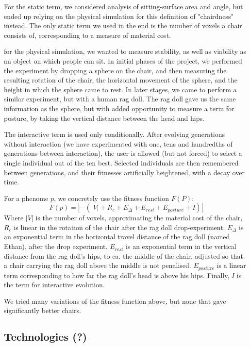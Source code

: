 For the static term, we considered analysis of sitting-surface area and angle,
but ended up relying on the physical simulation for this definition of
"chairdness" instead. The only static term we used in the end is the number of
voxels a chair consists of, corresponding to a measure of material cost.

for the physical simulation, we wanted to measure stability, as well as
viability as an object on which people can sit. In initial phases of the
project, we performed the experiment by dropping a sphere on the chair, and then
measuring the resulting rotation of the chair, the horizontal movement of the
sphere, and the height in which the sphere came to rest. In later stages, we
came to perform a similar experiment, but with a human rag doll. The rag doll
gave us the same information as the sphere, but with added opportunity to
measure a term for posture, by taking the vertical distance between the head and
hips.

The interactive term is used only conditionally. After evolving generations
without interaction (we have experimented with one, tens and hundredths of
generations between interaction), the user is allowed (but not forced) to select
a single individual out of the ten best. Selected individuals are then
remembered between generations, and their fitnesses artificially heightened,
with a decay over time.

For a phenome $p$, we concretely use the fitness function $F(P)$:
$$F(p) = \left|-(\left|V\right| + R_c + E_{\Delta} + E_{rest} + E_{posture} +
I)\right|$$
Where $|V|$ is the number of voxels, approximating the material cost of the
chair, $R_c$ is linear in the rotation of the chair after the rag doll
drop-experiment. $E_{\Delta}$ is an exponential term in the horizontal travel
distance of the rag doll (named Ethan), after the drop experiment. $E_{rest}$ is
an exponential term in the vertical distance from the rag doll's hips, to ca.
the middle of the chair, adjusted so that a chair carrying the rag doll above
the middle is not penalised. $E_{posture}$ is a linear term corresponding to how
far the rag doll's head is above his hips. Finally, $I$ is the term for
interactive evolution.

We tried many variations of the fitness function above, but none that
gave significantly better chairs.


\subsection{Technologies (?)}


